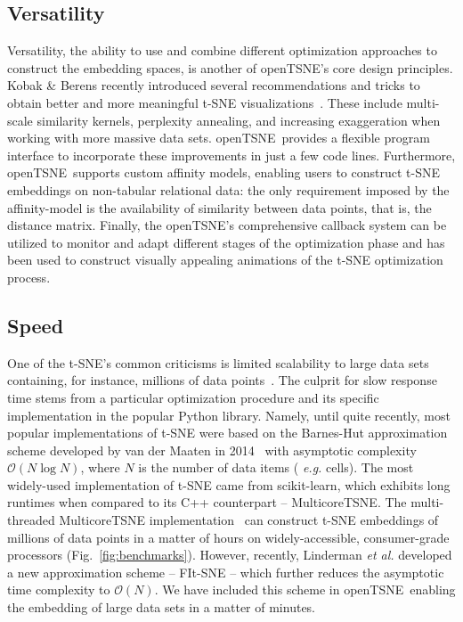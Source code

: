 \documentclass[twocolumn]{bmcart}
\newcommand{\opentsne}{\textsf{openTSNE}}
\begin{document}
\subsection*{Versatility}

Versatility, the ability to use and combine different optimization approaches to
construct the embedding spaces, is another of \opentsne's core design
principles. Kobak \& Berens recently introduced several recommendations and
tricks to obtain better and more meaningful t-SNE
visualizations~\cite{kobak2019art}. These include multi-scale similarity
kernels, perplexity annealing, and increasing exaggeration when working with
more massive data sets. \opentsne\ provides a flexible program interface to
incorporate these improvements in just a few code lines. Furthermore, \opentsne\
supports custom affinity models, enabling users to construct t-SNE embeddings on
non-tabular relational data: the only requirement imposed by the affinity-model
is the availability of similarity between data points, that is, the distance
matrix.  Finally, the \opentsne's comprehensive callback system can be utilized
to monitor and adapt different stages of the optimization phase and has been
used to construct visually appealing animations of the t-SNE optimization
process.


\subsection*{Speed}

One of the t-SNE's common criticisms is limited scalability to large data sets
containing, for instance, millions of data
points~\cite{becht2019dimensionality}. The culprit for slow response time stems
from a particular optimization procedure and its specific implementation in the
popular Python library. Namely, until quite recently, most popular
implementations of t-SNE were based on the Barnes-Hut approximation scheme
developed by van der Maaten in 2014~\cite{van2014accelerating} with asymptotic
complexity $\mathcal{O}(N \log N)$, where $N$ is the number of data items ({\em
e.g.} cells). The most widely-used implementation of t-SNE came from
\textsf{scikit-learn}, which exhibits long runtimes when compared to its C++
counterpart -- \textsf{MulticoreTSNE}. The multi-threaded \textsf{MulticoreTSNE}
implementation~\cite{Ulyanov2016} can construct t-SNE embeddings of millions of
data points in a matter of hours on widely-accessible, consumer-grade processors
(Fig.~\ref{fig:benchmarks}). However, recently, Linderman \textit{et al.}
developed a new approximation scheme -- FIt-SNE -- which further reduces the
asymptotic time complexity to $\mathcal{O}(N)$. We have included this scheme in
\opentsne\, enabling the embedding of large data sets in a matter of minutes. 
\end{document}
